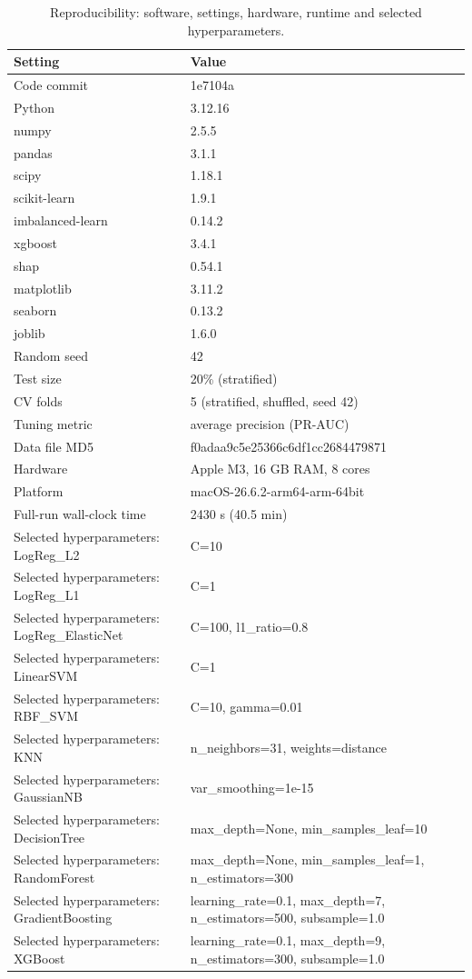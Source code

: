 \begin{table}[ht]
\centering
\small
\caption{Reproducibility: software, settings, hardware, runtime and selected hyperparameters.}
\label{tab:reproducibility}
\begin{tabular}{lp{9cm}}
\toprule
Setting & Value \\
\midrule
Code commit & 1e7104a \\
Python & 3.12.16 \\
numpy & 2.5.5 \\
pandas & 3.1.1 \\
scipy & 1.18.1 \\
scikit-learn & 1.9.1 \\
imbalanced-learn & 0.14.2 \\
xgboost & 3.4.1 \\
shap & 0.54.1 \\
matplotlib & 3.11.2 \\
seaborn & 0.13.2 \\
joblib & 1.6.0 \\
Random seed & 42 \\
Test size & 20\% (stratified) \\
CV folds & 5 (stratified, shuffled, seed 42) \\
Tuning metric & average precision (PR-AUC) \\
Data file MD5 & f0adaa9c5e25366c6df1cc2684479871 \\
Hardware & Apple M3, 16 GB RAM, 8 cores \\
Platform & macOS-26.6.2-arm64-arm-64bit \\
Full-run wall-clock time & 2430 s (40.5 min) \\
Selected hyperparameters: LogReg\_L2 & C=10 \\
Selected hyperparameters: LogReg\_L1 & C=1 \\
Selected hyperparameters: LogReg\_ElasticNet & C=100, l1\_ratio=0.8 \\
Selected hyperparameters: LinearSVM & C=1 \\
Selected hyperparameters: RBF\_SVM & C=10, gamma=0.01 \\
Selected hyperparameters: KNN & n\_neighbors=31, weights=distance \\
Selected hyperparameters: GaussianNB & var\_smoothing=1e-15 \\
Selected hyperparameters: DecisionTree & max\_depth=None, min\_samples\_leaf=10 \\
Selected hyperparameters: RandomForest & max\_depth=None, min\_samples\_leaf=1, n\_estimators=300 \\
Selected hyperparameters: GradientBoosting & learning\_rate=0.1, max\_depth=7, n\_estimators=500, subsample=1.0 \\
Selected hyperparameters: XGBoost & learning\_rate=0.1, max\_depth=9, n\_estimators=300, subsample=1.0 \\
\bottomrule
\end{tabular}
\end{table}
